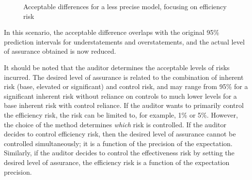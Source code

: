 \begin{figure} 
\begin{center}
\caption{Acceptable differences for a less precise model, focusing on efficiency risk}

\label{fig:method_inefficiency_less_precise}
\end{center}
\end{figure}

In this scenario, the acceptable difference overlaps with the original 95\% prediction intervals for understatements and overstatements, and the actual level of assurance obtained is now reduced.

\bigskip
It should be noted that the auditor determines the acceptable levels of risks incurred. The desired level of assurance is related to the combination of inherent risk (base, elevated or significant) and control risk, and may range from 95\% for a significant inherent risk without reliance on controls to much lower levels for a base inherent risk with control reliance. If the auditor wants to primarily control the efficiency risk, the risk can be limited to, for example, 1\% or 5\%. However, the choice of the method determines \emph{which} risk is controlled. If the auditor decides to control efficiency risk, then the desired level of assurance cannot be controlled simultaneously; it is a function of the precision of the expectation. Similarly, if the auditor decides to control the effectiveness risk by setting the desired level of assurance, the efficiency risk is a function of the expectation precision. 

